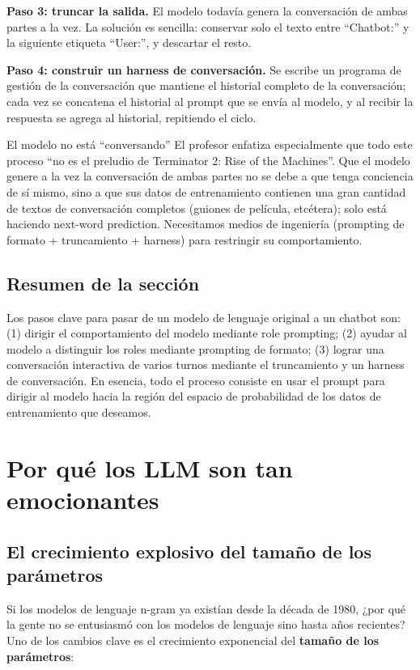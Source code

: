 \documentclass[a4paper]{article}
\begin{document}
\textbf{Paso 3: truncar la salida.} El modelo todavía genera la conversación de ambas partes a la vez. La solución es sencilla: conservar solo el texto entre ``Chatbot:'' y la siguiente etiqueta ``User:'', y descartar el resto.

\textbf{Paso 4: construir un harness de conversación.} Se escribe un programa de gestión de la conversación que mantiene el historial completo de la conversación; cada vez se concatena el historial al prompt que se envía al modelo, y al recibir la respuesta se agrega al historial, repitiendo el ciclo.

\begin{warningbox}{El modelo no está ``conversando''}
El profesor enfatiza especialmente que todo este proceso ``no es el preludio de Terminator 2: Rise of the Machines''. Que el modelo genere a la vez la conversación de ambas partes no se debe a que tenga conciencia de sí mismo, sino a que sus datos de entrenamiento contienen una gran cantidad de textos de conversación completos (guiones de película, etcétera); solo está haciendo next-word prediction. Necesitamos medios de ingeniería (prompting de formato + truncamiento + harness) para restringir su comportamiento.
\end{warningbox}

\subsection{Resumen de la sección}

Los pasos clave para pasar de un modelo de lenguaje original a un chatbot son: (1) dirigir el comportamiento del modelo mediante role prompting; (2) ayudar al modelo a distinguir los roles mediante prompting de formato; (3) lograr una conversación interactiva de varios turnos mediante el truncamiento y un harness de conversación. En esencia, todo el proceso consiste en usar el prompt para dirigir al modelo hacia la región del espacio de probabilidad de los datos de entrenamiento que deseamos.
\section{Por qué los LLM son tan emocionantes}

\subsection{El crecimiento explosivo del tamaño de los parámetros}

Si los modelos de lenguaje n-gram ya existían desde la década de 1980, ¿por qué la gente no se entusiasmó con los modelos de lenguaje sino hasta años recientes? Uno de los cambios clave es el crecimiento exponencial del \textbf{tamaño de los parámetros}:
\end{document}
